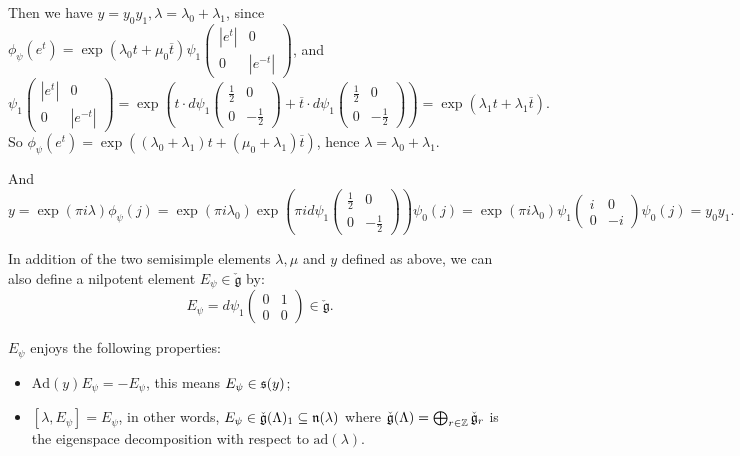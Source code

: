 \documentclass[12pt]{amsart}
\numberwithin{equation}{section}
\newcommand{\fg}{\mathfrak{g}} \newcommand{\fh}{\mathfrak{h}} \newcommand{\fk}{\mathfrak{k}}
\newcommand{\Ad}{{\mathrm{Ad}}}   \newcommand{\ad}{{\mathrm{ad}}}
\renewcommand{\bar}{\overline}
\begin{document}
Then we have $y = y_0 y_1, \lambda = \lambda_0 + \lambda_1$, since $\phi_{\psi}(e^t) = \exp(\lambda_0 t + \mu_0 \bar{t})\psi_1\begin{pmatrix} |e^{t}| & 0 \\ 0 & |e^{-t}| \end{pmatrix}$, and 
\[
\psi_1\begin{pmatrix} |e^{t}| & 0 \\ 0 & |e^{-t}| \end{pmatrix} = \exp\left( t \cdot d\psi_1 \begin{pmatrix}\frac{1}{2} & 0 \\ 0 & -\frac{1}{2} \end{pmatrix} + \bar{t} \cdot d\psi_1 \begin{pmatrix}\frac{1}{2} & 0 \\ 0 & -\frac{1}{2} \end{pmatrix} \right) = \exp(\lambda_1 t + \lambda_1 \bar{t}).
\]
So $\phi_{\psi}(e^t) = \exp((\lambda_0 + \lambda_1)t + (\mu_0 + \lambda_1)\bar{t})$, hence $\lambda = \lambda_0 + \lambda_1$.

And \[y = \exp(\pi i \lambda)\phi_{\psi}(j) = \exp(\pi i \lambda_0) \exp(\pi i d\psi_1 \begin{pmatrix} \frac{1}{2} & 0 \\ 0 & -\frac{1}{2} \end{pmatrix})\psi_0(j) = \exp(\pi i \lambda_0) \psi_1 \begin{pmatrix}
  i & 0 \\ 0 & -i
\end{pmatrix} \psi_0(j) = y_0 y_1 .\]

In addition of the two semisimple elements $\lambda, \mu$ and $y$ defined as above, we can also define a nilpotent element $E_{\psi} \in \check{\fg}$ by:
\[E_{\psi} = d\psi_{1}\begin{pmatrix}0 & 1 \\ 0 & 0\end{pmatrix} \in \check{\fg}.\]

$E_{\psi}$ enjoys the following properties:
\begin{itemize}
  \item $\Ad(y) E_{\psi} = -E_{\psi}$, this means $E_{\psi} \in \mathfrak{s}(y)$;
  \item $[\lambda, E_{\psi}] =  E_{\psi}$, in other words, $E_{\psi} \in \check{\fg}(\Lambda)_{1} \subseteq \fn(\lambda)$ where $\check{\fg}(\Lambda) = \bigoplus_{r \in \BZ} \check{\fg}_r$ is the eigenspace decomposition with respect to $\ad(\lambda)$.
\end{itemize}
\end{document}
